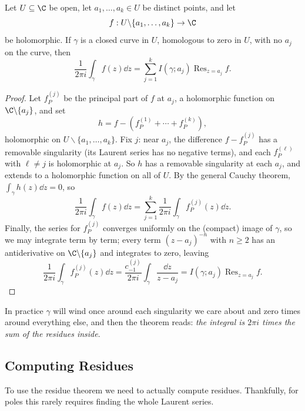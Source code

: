 \begin{theorem}
    Let $U \subseteq \C$ be open, let $a_1, \dots, a_k \in U$ be distinct points, and let
    $$
    f: U \backslash \{a_1, \dots, a_k\} \rightarrow \C
    $$
    be holomorphic. If $\gamma$ is a closed curve in $U$, homologous to zero in $U$, with no $a_j$ on the curve, then
    $$
    \frac{1}{2 \pi i} \int_\gamma f(z) \dd z = \sum_{j = 1}^{k} I(\gamma; a_j) \operatorname{Res}_{z = a_j} f.
    $$
\end{theorem}
\begin{proof}
    Let $f_P^{(j)}$ be the principal part of $f$ at $a_j$, a holomorphic function on $\C \backslash \{a_j\}$, and set
    $$
    h = f - \left(f_P^{(1)} + \cdots + f_P^{(k)}\right),
    $$
    holomorphic on $U \backslash \{a_1, \dots, a_k\}$. Fix $j$: near $a_j$, the difference $f - f_P^{(j)}$ has a removable singularity (its Laurent series has no negative terms), and each $f_P^{(\ell)}$ with $\ell \neq j$ is holomorphic at $a_j$. So $h$ has a removable singularity at each $a_j$, and extends to a holomorphic function on all of $U$. By the general Cauchy theorem, $\int_\gamma h(z) \dd z = 0$, so
    $$
    \frac{1}{2 \pi i}\int_\gamma f(z) \dd z = \sum_{j = 1}^{k} \frac{1}{2 \pi i}\int_\gamma f_P^{(j)}(z) \dd z.
    $$
    Finally, the series for $f_P^{(j)}$ converges uniformly on the (compact) image of $\gamma$, so we may integrate term by term; every term $(z - a_j)^{-n}$ with $n \geq 2$ has an antiderivative on $\C \backslash \{a_j\}$ and integrates to zero, leaving
    \[
    \frac{1}{2 \pi i} \int_\gamma f_P^{(j)}(z) \dd z = \frac{c^{(j)}_{-1}}{2 \pi i} \int_\gamma \frac{\dd z}{z - a_j} = I(\gamma; a_j)\operatorname{Res}_{z = a_j} f.
    \]
\end{proof}

In practice $\gamma$ will wind once around each singularity we care about and zero times around everything else, and then the theorem reads: \emph{the integral is $2\pi i$ times the sum of the residues inside}.

\subsection{Computing Residues}

To use the residue theorem we need to actually compute residues. Thankfully, for poles this rarely requires finding the whole Laurent series.

